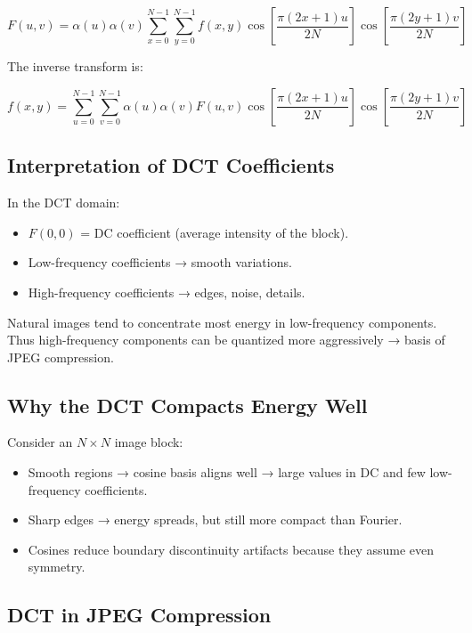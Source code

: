 \documentclass{AnantDocumentation}
\begin{document}
\begin{equation}
F(u,v) = 
\alpha(u)\alpha(v)
\sum_{x=0}^{N-1}\sum_{y=0}^{N-1}
f(x,y)\cos\left[\frac{\pi(2x+1)u}{2N}\right]
\cos\left[\frac{\pi(2y+1)v}{2N}\right]
\end{equation}

The inverse transform is:

\begin{equation}
f(x,y) =
\sum_{u=0}^{N-1}\sum_{v=0}^{N-1}
\alpha(u)\alpha(v) F(u,v)
\cos\left[\frac{\pi(2x+1)u}{2N}\right]
\cos\left[\frac{\pi(2y+1)v}{2N}\right]
\end{equation}

\subsection{Interpretation of DCT Coefficients}

In the DCT domain:

\begin{itemize}
\item \(F(0,0)\) = DC coefficient (average intensity of the block).  
\item Low-frequency coefficients → smooth variations.  
\item High-frequency coefficients → edges, noise, details.
\end{itemize}

Natural images tend to concentrate most energy in low-frequency components.  
Thus high-frequency components can be quantized more aggressively → basis of JPEG compression.

\subsection{Why the DCT Compacts Energy Well}

Consider an $N \times N$ image block:

\begin{itemize}
\item Smooth regions → cosine basis aligns well → large values in DC and few low-frequency coefficients.
\item Sharp edges → energy spreads, but still more compact than Fourier.
\item Cosines reduce boundary discontinuity artifacts because they assume even symmetry.
\end{itemize}

\subsection{DCT in JPEG Compression}
\end{document}
